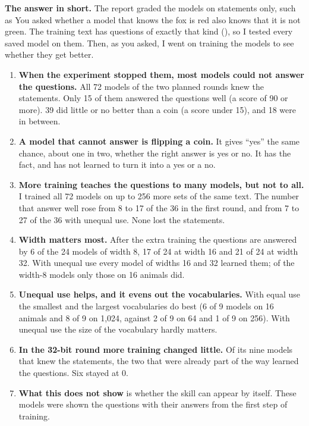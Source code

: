 \begin{keybox}
\textbf{The answer in short.} The report graded the models on statements only, such as
 You asked whether a model that knows the fox is red also knows that it is
not green. The training text has questions of exactly that kind (), so
I tested every saved model on them. Then, as you asked, I went on training the models to see
whether they get better.

\begin{enumerate}[itemsep=1pt,topsep=2pt]
\item \textbf{When the experiment stopped them, most models could not answer the questions.}
      All 72 models of the two planned rounds knew the statements. Only 15 of them answered
      the questions well (a score of 90 or more). 39 did little or no better than a coin (a
      score under 15), and 18 were in between.
\item \textbf{A model that cannot answer is flipping a coin.} It gives ``yes'' the same
      chance, about one in two, whether the right answer is yes or no. It has the fact, and
      has not learned to turn it into a yes or a no.
\item \textbf{More training teaches the questions to many models, but not to all.} I trained
      all 72 models on up to 256 more sets of the same text. The number that answer well rose
      from 8 to 17 of the 36 in the first round, and from 7 to 27 of the 36 with unequal use.
      None lost the statements.
\item \textbf{Width matters most.} After the extra training the questions are answered by 6
      of the 24 models of width 8, 17 of 24 at width 16 and 21 of 24 at width 32. With unequal
      use every model of widths 16 and 32 learned them; of the width-8 models only those on 16
      animals did.
\item \textbf{Unequal use helps, and it evens out the vocabularies.} With equal use the
      smallest and the largest vocabularies do best (6 of 9 models on 16 animals and 8 of 9 on
      1,024, against 2 of 9 on 64 and 1 of 9 on 256). With unequal use the size of the
      vocabulary hardly matters.
\item \textbf{In the 32-bit round more training changed little.} Of its nine models that knew
      the statements, the two that were already part of the way learned the questions. Six
      stayed at 0.
\item \textbf{What this does not show} is whether the skill can appear by itself. These
      models were shown the questions with their answers from the first step of training.
\end{enumerate}
\end{keybox}

